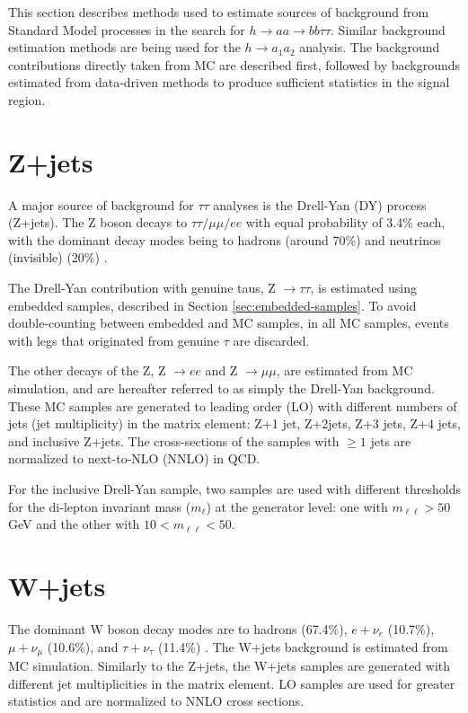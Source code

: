 This section describes methods used to estimate sources of background from Standard Model processes in the search for $h \rightarrow aa \rightarrow bb\tau\tau$. Similar background estimation methods are being used for the $h \rightarrow a_1 a_2$ analysis. The background contributions directly taken from MC are described first, followed by backgrounds estimated from data-driven methods to produce sufficient statistics in the signal region.

\section{Z+jets}

A major source of background for $\tau\tau$ analyses is the Drell-Yan (DY) process (Z+jets). The Z boson decays to $\tau\tau/ \mu\mu/ ee$ with equal probability of 3.4\% each, with the dominant decay modes being to hadrons (around 70\%) and neutrinos (invisible) (20\%) \cite{workman_review_2022}. 

The Drell-Yan contribution with genuine taus, Z $\rightarrow \tau\tau$, is estimated using embedded samples, described in Section \ref{sec:embedded-samples}. To avoid double-counting between embedded and MC samples, in all MC samples, events with legs that originated from genuine $\tau$ are discarded.

The other decays of the Z, Z $\rightarrow ee$ and Z $\rightarrow \mu\mu$, are estimated from MC simulation, and are hereafter referred to as simply the Drell-Yan background. These MC samples are generated to leading order (LO) with different numbers of jets (jet multiplicity) in the matrix element: Z+1 jet, Z+2jets, Z+3 jets, Z+4 jets, and inclusive Z+jets. The cross-sections of the samples with $\geq 1$ jets are normalized to next-to-NLO (NNLO) in QCD.

For the inclusive Drell-Yan sample, two samples are used with different thresholds for the di-lepton invariant mass ($m_{\ell}$) at the generator level: one with $m_{\ell\ell} > 50$ GeV and the other with $10 < m_{\ell\ell} < 50$. 

\section{W+jets}

The dominant W boson decay modes are to hadrons (67.4\%), $e + \nu_e$ (10.7\%), $\mu + \nu_\mu$ (10.6\%), and $\tau + \nu_\tau$ (11.4\%) \cite{workman_review_2022}.
The W+jets background is estimated from MC simulation. Similarly to the Z+jets, the W+jets samples are generated with different jet multiplicities in the matrix element. LO samples are used for greater statistics and are normalized to NNLO cross sections. 

